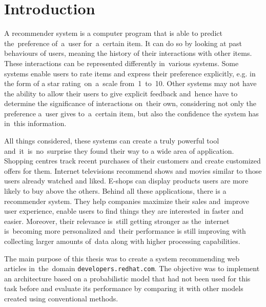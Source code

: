 

\chapter*{Introduction}
A recommender system is a computer program that is able to predict the~preference of~a~user for~a~certain item. It can do so by looking at past behaviours of users, meaning the history of their interactions with other items. These interactions can be represented differently in~various systems. Some systems enable users to rate items and express their preference explicitly, e.g. in the form of a star rating~on~a~scale from~1~to~10. Other systems may not have the ability to allow their users to give explicit feedback and~hence have to determine the significance of interactions on~their own, considering not only the preference a~user gives to~a~certain item, but also the confidence the system has in~this information.


All things considered, these systems can create a truly powerful tool and~it~is~no~surprise they found their way to a wide area of application. Shopping centres track recent purchases of their customers and create customized offers for them. Internet televisions recommend shows and movies similar to those users already watched and liked. E-shops can display products users are more likely to buy above the others. Behind all these applications, there is a recommender system. They help companies maximize their sales and~improve user experience, enable users to find things they are interested~in faster and easier. Moreover, their relevance is~still getting stronger as the~internet is~becoming more personalized and~their performance is still improving with collecting larger amounts of~data along with higher processing capabilities.

The main purpose of this thesis was to create a system recommending web articles in~the~domain \texttt{developers.redhat.com}. The objective was to implement an architecture based on a probabilistic model that had not been used for this task before and evaluate its performance by comparing it with other models created using conventional methods.

